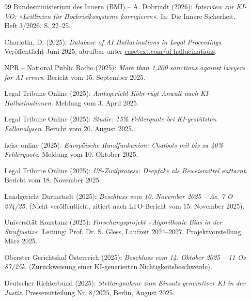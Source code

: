 \documentclass[12pt,a4paper]{article}
\begin{document}
\begin{thebibliography}{99}
		 Bundesministerium des Innern (BMI) – A. Dobrindt (2026): \emph{Interview zur KI-VO: »Leitlinien für Hochrisikosysteme korrigieren«}. In: Die Innere Sicherheit, Heft 3/2026, S. 22–25.
		
		 Charlotin, D. (2025): \emph{Database of AI Hallucinations in Legal Proceedings}. Veröffentlicht Juni 2025, abrufbar unter \url{casetext.com/ai-hallucinations}.
		
		 NPR – National Public Radio (2025): \emph{More than 1,200 sanctions against lawyers for AI errors}. Bericht vom 15. September 2025.
		
		 Legal Tribune Online (2025): \emph{Amtsgericht Köln rügt Anwalt nach KI-Halluzinationen}. Meldung vom 3. April 2025.
		
		 Legal Tribune Online (2025): \emph{Studie: 15\% Fehlerquote bei KI-gestützten Fallanalysen}. Bericht vom 20. August 2025.
		
		 heise online (2025): \emph{Europäische Rundfunkunion: Chatbots mit bis zu 40\% Fehlerquote}. Meldung vom 10. Oktober 2025.
		
		 Legal Tribune Online (2025): \emph{US-Zivilprozess: Deepfake als Beweismittel enttarnt}. Bericht vom 18. November 2025.
		
		 Landgericht Darmstadt (2025): \emph{Beschluss vom 10. November 2025 – Az. 7 O 234/25}. (Nicht veröffentlicht, zitiert nach LTO-Bericht vom 15. November 2025).
		
		 Universität Konstanz (2025): \emph{Forschungsprojekt »Algorithmic Bias in der Strafjustiz«}. Leitung: Prof. Dr. S. Gless, Laufzeit 2024–2027. Projektvorstellung März 2025.
		
		 Oberster Gerichtshof Österreich (2025): \emph{Beschluss vom 14. Oktober 2025 – 11 Os 87/25k}. (Zurückweisung einer KI-generierten Nichtigkeitsbeschwerde).
		
		 Deutscher Richterbund (2025): \emph{Stellungnahme zum Einsatz generativer KI in der Justiz}. Pressemitteilung Nr. 8/2025, Berlin, August 2025.
		
	\end{thebibliography}
	
\end{document}
